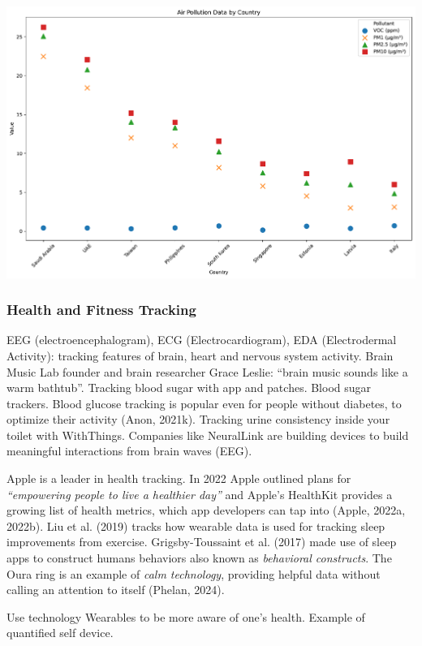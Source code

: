 \documentclass[
  letterpaper,
  DIV=11,
  numbers=noendperiod]{scrartcl}
\begin{document}
\includegraphics{_thesis_files/figure-pdf/cell-27-output-1.pdf}

\subsubsection{\texorpdfstring{\textbf{Health and Fitness
Tracking}}{Health and Fitness Tracking}}\label{health-and-fitness-tracking}

EEG (electroencephalogram), ECG (Electrocardiogram), EDA (Electrodermal
Activity): tracking features of brain, heart and nervous system
activity. Brain Music Lab founder and brain researcher Grace Leslie:
``brain music sounds like a warm bathtub''. Tracking blood sugar with
app and patches. Blood sugar trackers. Blood glucose tracking is popular
even for people without diabetes, to optimize their activity (Anon,
2021k). Tracking urine consistency inside your toilet with WithThings.
Companies like NeuralLink are building devices to build meaningful
interactions from brain waves (EEG).

Apple is a leader in health tracking. In 2022 Apple outlined plans for
\emph{``empowering people to live a healthier day''} and Apple's
HealthKit provides a growing list of health metrics, which app
developers can tap into (Apple, 2022a, 2022b). Liu et al. (2019) tracks
how wearable data is used for tracking sleep improvements from exercise.
Grigsby-Toussaint et al. (2017) made use of sleep apps to construct
humans behaviors also known as \emph{behavioral constructs}. The Oura
ring is an example of \emph{calm technology}, providing helpful data
without calling an attention to itself (Phelan, 2024).

Use technology Wearables to be more aware of one's health. Example of
quantified self device.
\end{document}
